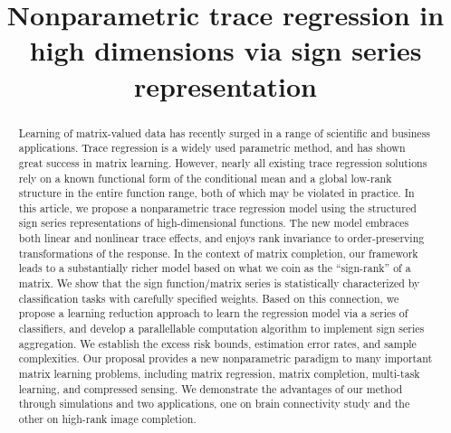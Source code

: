 \documentclass[aos]{imsart}
\theoremstyle{definition}
\begin{document}
\begin{frontmatter}
\title{Nonparametric trace regression in high dimensions via sign series representation}




\begin{abstract}
Learning of matrix-valued data has recently surged in a range of scientific and business applications. Trace regression is a widely used parametric method, and has shown great success in matrix learning. However, nearly all existing trace regression solutions rely on a known functional form of the conditional mean and a global low-rank structure in the entire function range, both of which may be violated in practice. In this article, we propose a nonparametric trace regression model using the structured sign series representations of high-dimensional functions. The new model embraces both linear and nonlinear trace effects, and enjoys rank invariance to order-preserving transformations of the response. In the context of matrix completion, our framework leads to a substantially richer model based on what we coin as the ``sign-rank'' of a matrix. We show that the sign function/matrix series is statistically characterized by classification tasks with carefully specified weights. Based on this connection, we propose a learning reduction approach to learn the regression model via a series of classifiers, and develop a parallellable computation algorithm to implement sign series aggregation. We establish the excess risk bounds, estimation error rates, and sample complexities. Our proposal provides a new nonparametric paradigm to many important matrix learning problems, including matrix regression, matrix completion, multi-task learning, and compressed sensing. We demonstrate the advantages of our method through simulations and two applications, one on brain connectivity study and the other on high-rank image completion. 
\end{abstract}


\begin{keyword}[class=MSC2020]
\end{keyword}
\begin{keyword}
\end{keyword}

\end{frontmatter}
\end{document}
